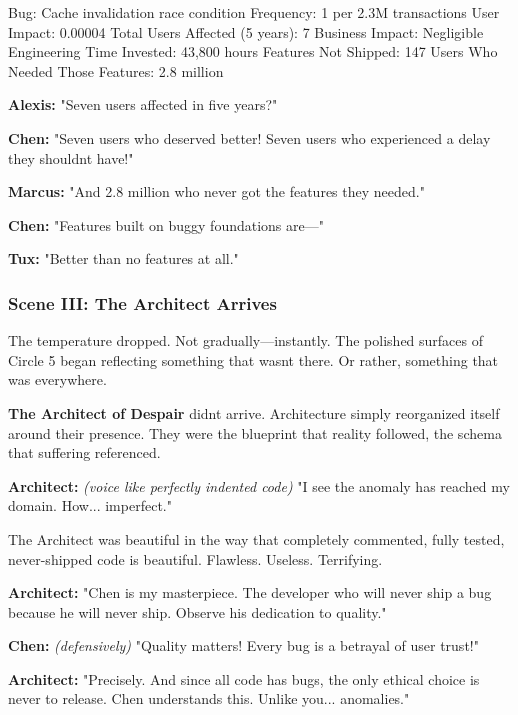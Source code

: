\begin{codeblock}
Bug: Cache invalidation race condition
Frequency: 1 per 2.3M transactions  
User Impact: 0.00004%
Total Users Affected (5 years): 7
Business Impact: Negligible
Engineering Time Invested: 43,800 hours
Features Not Shipped: 147
Users Who Needed Those Features: 2.8 million
\end{codeblock}

\textbf{Alexis:} "Seven users affected in five years?"

\textbf{Chen:} "Seven users who deserved better! Seven users who experienced a delay they shouldn\textquotesingle t have!"

\textbf{Marcus:} "And 2.8 million who never got the features they needed."

\textbf{Chen:} "Features built on buggy foundations are---"

\textbf{Tux:} "Better than no features at all."

\bookdivider

\subsubsection{Scene III: The Architect Arrives}\label{scene-iii-the-architect-arrives}

The temperature dropped. Not gradually---instantly. The polished surfaces of Circle 5 began reflecting something that wasn\textquotesingle t there. Or rather, something that was everywhere.

\textbf{The Architect of Despair} didn\textquotesingle t arrive. Architecture simply reorganized itself around their presence. They were the blueprint that reality followed, the schema that suffering referenced.

\textbf{Architect:} \emph{(voice like perfectly indented code)} "I see the anomaly has reached my domain. How... imperfect."

The Architect was beautiful in the way that completely commented, fully tested, never-shipped code is beautiful. Flawless. Useless. Terrifying.

\textbf{Architect:} "Chen is my masterpiece. The developer who will never ship a bug because he will never ship. Observe his dedication to quality."

\textbf{Chen:} \emph{(defensively)} "Quality matters! Every bug is a betrayal of user trust!"

\textbf{Architect:} "Precisely. And since all code has bugs, the only ethical choice is never to release. Chen understands this. Unlike you... anomalies."


